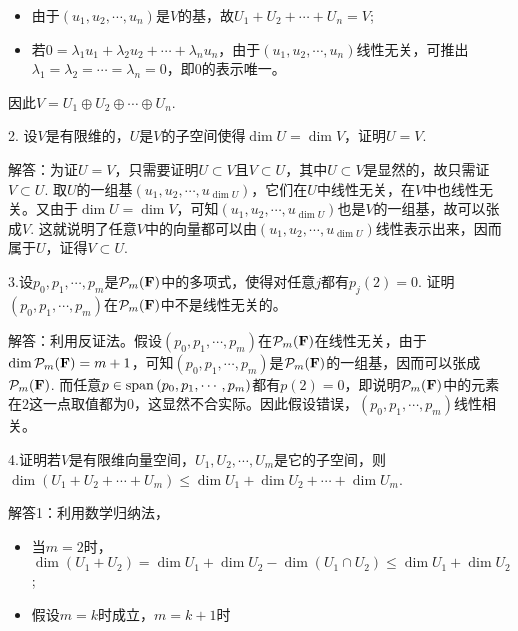 \documentclass[hyperref,]{ctexart}
\providecommand{\tightlist}{%
  \setlength{\itemsep}{0pt}\setlength{\parskip}{0pt}}
\begin{document}
\begin{itemize}
\tightlist
\item
  由于\((u_1,u_2,\cdots,u_n)\)是\(V\)的基，故\(U_1+U_2+\cdots+U_n=V\);
\item
  若\(0=\lambda_1 u_1+\lambda_2 u_2+\cdots +\lambda_n u_n\)，由于\((u_1,u_2,\cdots,u_n)\)线性无关，可推出\(\lambda_1=\lambda_2=\cdots=\lambda_n=0\)，即\(0\)的表示唯一。
\end{itemize}

因此\(V=U_1\oplus U_2\oplus\cdots\oplus U_n\).

\bigskip

\noindent{}2.
设\(V\)是有限维的，\(U\)是\(V\)的子空间使得\(\dim U=\dim V\)，证明\(U=V\).

\noindent{}
解答：为证\(U=V\)，只需要证明\(U\subset V\)且\(V\subset U\)，其中\(U\subset V\)是显然的，故只需证\(V\subset U\).
取\(U\)的一组基\((u_1,u_2,\cdots,u_{\dim U})\)，它们在\(U\)中线性无关，在\(V\)中也线性无关。又由于\(\dim U=\dim V\)，可知\((u_1,u_2,\cdots,u_{\dim U})\)也是\(V\)的一组基，故可以张成\(V\).
这就说明了任意\(V\)中的向量都可以由\((u_1,u_2,\cdots,u_{\dim U})\)线性表示出来，因而属于\(U\)，证得\(V\subset U\).

\bigskip

\noindent{}
3.设\(p_0,p_1,\cdots,p_m\)是\(\mathcal{P}_m(\mathbf{F})\)中的多项式，使得对任意\(j\)都有\(p_j(2)=0\).
证明\((p_0,p_1,\cdots,p_m)\)在\(\mathcal{P}_m(\mathbf{F})\)中不是线性无关的。

\noindent{}
解答：利用反证法。假设\((p_0,p_1,\cdots,p_m)\)在\(\mathcal{P}_m(\mathbf{F})\)在线性无关，由于\(\mathrm{dim}\,\mathcal{P}_m(\mathbf{F})=m+1\)，可知\((p_0,p_1,\cdots,p_m)\)是\(\mathcal{P}_m(\mathbf{F})\)的一组基，因而可以张成\(\mathcal{P}_m(\mathbf{F})\).
而任意\(p\in \mathrm{span}\,(p_0,p_1,\cdots,p_m)\)都有\(p(2)=0\)，即说明\(\mathcal{P}_m(\mathbf{F})\)中的元素在\(2\)这一点取值都为\(0\)，这显然不合实际。因此假设错误，\((p_0,p_1,\cdots,p_m)\)线性相关。

\bigskip

\noindent{}
4.证明若\(V\)是有限维向量空间，\(U_1,U_2,\cdots,U_m\)是它的子空间，则\(\dim(U_1+U_2+\cdots+U_m)\le \dim U_1+\dim U_2+\cdots+\dim U_m\).

\noindent{} 解答1：利用数学归纳法，

\begin{itemize}
\tightlist
\item
  当\(m=2\)时，\(\dim(U_1+U_2)=\dim U_1+\dim U_2-\dim(U_1\cap U_2)\le\dim U_1+\dim U_2\);
\item
  假设\(m=k\)时成立，\(m=k+1\)时
\end{itemize}
\end{document}
